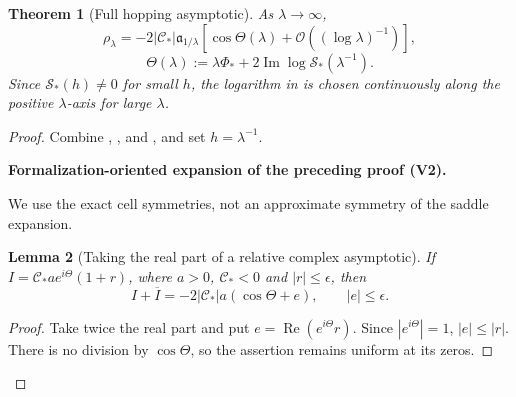 \documentclass[11pt]{article}
\newtheorem{theorem}{Theorem}[section]
\newtheorem{lemma}[theorem]{Lemma}
\newcommand{\formalisationparentid}{X}
\newenvironment{formalisationaddition}[1]{\par\medskip\begingroup\color{blue}\def\formalisationparentid{#1}\setcounter{formalizationsublemma}{0}\let\lemma\formalizationsublemma\let\endlemma\endformalizationsublemma
  \def\Eo{\mathcal E_h^\circ}\def\EE{\mathcal E_h}\def\phio{\phi_h^\circ}\def\phih{\phi_h}\def\Ho{H_h^{\rm atom}(v^\circ)}\def\Ha{H_h^{\rm atom}}\def\HL{H_h^{L}}\def\Dh{D_h}\def\Log{\operatorname{Log}}\def\ellh{\ell_h}\def\Gp{G_{p,h}}\def\Ast{A_{*,h}}\def\ahat{\widehat{\mathfrak a}_h}\def\ah{\mathfrak a_h}\def\rh{\widehat\rho_h}\def\deltah{\widehat\delta_h}\def\oldref##1{\textup{(##1)}}\def\interface##1{\par\noindent\textit{Analytical interface used here.} ##1\par}\def\finish{\par\noindent\textit{Conclusion of the formalization-oriented expansion.} }\par\noindent\textbf{Formalization-oriented expansion of the preceding proof (V2).}\par\smallskip
}{\par\endgroup\medskip
}
\newcommand{\cO}{\mathcal O}
\newcommand{\Rea}{\operatorname{Re}}
\newcommand{\Ima}{\operatorname{Im}}
\begin{document}
\begin{theorem}[Full hopping asymptotic]
\label{thm:full-hopping}
As $\lambda\to\infty$,
\begin{equation}\label{eq:full-hopping}
 \rho_\lambda
 =-2|\mathscr C_*|\mathfrak a_{1/\lambda}
 \left[\cos\Theta(\lambda)
 +\cO\!\left((\log\lambda)^{-1}\right)\right],
\end{equation}
\begin{equation}\label{eq:Theta}
 \Theta(\lambda):=\lambda\Phi_*+2\Ima\log \mathcal S_*(\lambda^{-1}).
\end{equation}
Since $\mathcal S_*(h)\ne0$ for small $h$, the logarithm in
 is chosen continuously along the positive $\lambda$-axis
for large $\lambda$.
\end{theorem}

\begin{proof}
Combine , , and
, and set $h=\lambda^{-1}$.

\begin{formalisationaddition}{T7.2}
We use the exact cell symmetries, not an approximate symmetry of the saddle expansion.

\begin{lemma}[Taking the real part of a relative complex asymptotic]\label{sublemma:T7-2-real-part}
If $I=\mathscr C_*a e^{i\Theta}(1+r)$, where $a>0$, $\mathscr C_*<0$ and $|r|\le\epsilon$, then
\[
 I+\overline I=-2|\mathscr C_*|a(\cos\Theta+e),\qquad |e|\le\epsilon.
\]
\end{lemma}
\begin{proof}
Take twice the real part and put $e=\Rea(e^{i\Theta}r)$. Since $|e^{i\Theta}|=1$, $|e|\le|r|$. There is no division by $\cos\Theta$, so the assertion remains uniform at its zeros.
\end{proof}


\end{formalisationaddition}
\end{proof}
\end{document}
